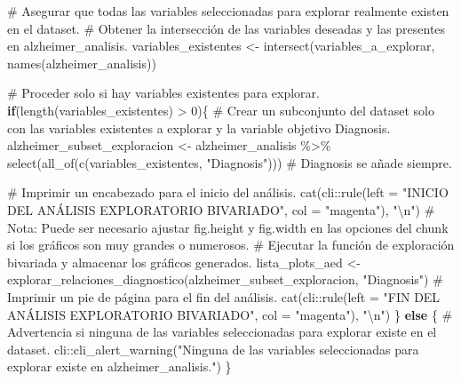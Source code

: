 \documentclass[
  letterpaper,
  DIV=11,
  numbers=noendperiod]{scrartcl}
\newenvironment{Shaded}{\begin{snugshade}}{\end{snugshade}}
\newcommand{\AttributeTok}[1]{\textcolor[rgb]{0.40,0.45,0.13}{#1}}
\newcommand{\CommentTok}[1]{\textcolor[rgb]{0.37,0.37,0.37}{#1}}
\newcommand{\ControlFlowTok}[1]{\textcolor[rgb]{0.00,0.23,0.31}{\textbf{#1}}}
\newcommand{\DecValTok}[1]{\textcolor[rgb]{0.68,0.00,0.00}{#1}}
\newcommand{\FunctionTok}[1]{\textcolor[rgb]{0.28,0.35,0.67}{#1}}
\newcommand{\NormalTok}[1]{\textcolor[rgb]{0.00,0.23,0.31}{#1}}
\newcommand{\OtherTok}[1]{\textcolor[rgb]{0.00,0.23,0.31}{#1}}
\newcommand{\SpecialCharTok}[1]{\textcolor[rgb]{0.37,0.37,0.37}{#1}}
\newcommand{\StringTok}[1]{\textcolor[rgb]{0.13,0.47,0.30}{#1}}
\begin{document}
\begin{Shaded}
\begin{Highlighting}[]
  \CommentTok{\# Asegurar que todas las variables seleccionadas para explorar realmente existen en el dataset.}
  \CommentTok{\# Obtener la intersección de las variables deseadas y las presentes en \textquotesingle{}alzheimer\_analisis\textquotesingle{}.}
\NormalTok{  variables\_existentes }\OtherTok{\textless{}{-}} \FunctionTok{intersect}\NormalTok{(variables\_a\_explorar, }\FunctionTok{names}\NormalTok{(alzheimer\_analisis))}
  
  \CommentTok{\# Proceder solo si hay variables existentes para explorar.}
  \ControlFlowTok{if}\NormalTok{(}\FunctionTok{length}\NormalTok{(variables\_existentes) }\SpecialCharTok{\textgreater{}} \DecValTok{0}\NormalTok{)\{}
    \CommentTok{\# Crear un subconjunto del dataset solo con las variables existentes a explorar y la variable objetivo \textquotesingle{}Diagnosis\textquotesingle{}.}
\NormalTok{    alzheimer\_subset\_exploracion }\OtherTok{\textless{}{-}}\NormalTok{ alzheimer\_analisis }\SpecialCharTok{\%\textgreater{}\%}
      \FunctionTok{select}\NormalTok{(}\FunctionTok{all\_of}\NormalTok{(}\FunctionTok{c}\NormalTok{(variables\_existentes, }\StringTok{"Diagnosis"}\NormalTok{))) }\CommentTok{\# \textquotesingle{}Diagnosis\textquotesingle{} se añade siempre.}
    
    \CommentTok{\# Imprimir un encabezado para el inicio del análisis.}
    \FunctionTok{cat}\NormalTok{(cli}\SpecialCharTok{::}\FunctionTok{rule}\NormalTok{(}\AttributeTok{left =} \StringTok{"INICIO DEL ANÁLISIS EXPLORATORIO BIVARIADO"}\NormalTok{, }\AttributeTok{col =} \StringTok{"magenta"}\NormalTok{), }\StringTok{"}\SpecialCharTok{\textbackslash{}n}\StringTok{"}\NormalTok{)}
    \CommentTok{\# Nota: Puede ser necesario ajustar fig.height y fig.width en las opciones del chunk si los gráficos son muy grandes o numerosos.}
    \CommentTok{\# Ejecutar la función de exploración bivariada y almacenar los gráficos generados.}
\NormalTok{    lista\_plots\_aed }\OtherTok{\textless{}{-}} \FunctionTok{explorar\_relaciones\_diagnostico}\NormalTok{(alzheimer\_subset\_exploracion, }\StringTok{"Diagnosis"}\NormalTok{)}
    \CommentTok{\# Imprimir un pie de página para el fin del análisis.}
    \FunctionTok{cat}\NormalTok{(cli}\SpecialCharTok{::}\FunctionTok{rule}\NormalTok{(}\AttributeTok{left =} \StringTok{"FIN DEL ANÁLISIS EXPLORATORIO BIVARIADO"}\NormalTok{, }\AttributeTok{col =} \StringTok{"magenta"}\NormalTok{), }\StringTok{"}\SpecialCharTok{\textbackslash{}n}\StringTok{"}\NormalTok{)}
\NormalTok{  \} }\ControlFlowTok{else}\NormalTok{ \{}
    \CommentTok{\# Advertencia si ninguna de las variables seleccionadas para explorar existe en el dataset.}
\NormalTok{    cli}\SpecialCharTok{::}\FunctionTok{cli\_alert\_warning}\NormalTok{(}\StringTok{"Ninguna de las variables seleccionadas para explorar existe en \textquotesingle{}alzheimer\_analisis\textquotesingle{}."}\NormalTok{)}
\NormalTok{  \}}
  

\end{Highlighting}
\end{Shaded}
\end{document}
